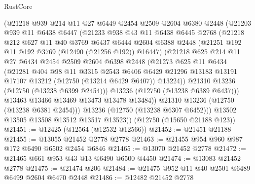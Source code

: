 \begin{lexlean}{RustCore}
\begin{coremodule}
          (@21218
            @939
            @214
            @11
            @27
            @6449
            @2454
            @2509
            @2604
            @6380
            @2448
            (@21203
              @939
              @11
              @6438
              @6447
              (@21233
                @938
                @43
                @11
                @6438
                @6445
                @2768
                (@21218
                  @212
                  @627
                  @11
                  @40
                  @3769
                  @6437
                  @6444
                  @2604
                  @6388
                  @2448
                  (@21251 @192 @11 @192 @3769 (@12490 (@21256 @192)) @16447)
                  (@21218
                    @625
                    @214
                    @11
                    @27
                    @6434
                    @2454
                    @2509
                    @2604
                    @6398
                    @2448
                    (@21273
                      @625
                      @11
                      @6434
                      (@21281
                        @404
                        @98
                        @11
                        @3315
                        @2543
                        @6406
                        @6429
                        @21296
                        @13183
                        @13191
                        @17107
                        @13212
                        (@12750 (@13214 @6429 @6407))
                        @13224))
                    @21310
                    @13236
                    (@12750 (@13238 @6399 @2454)))
                  @13236
                  (@12750 (@13238 @6389 @6437)))
                @13463
                @13466
                @13469
                @13473
                @13478
                @13484))
            @21310
            @13236
            (@12750 (@13238 @6381 @2454)))
          @13236
          (@12750 (@13238 @6307 @6452)))
        @13502
        @13505
        @13508
        @13512
        @13517
        @13523))
    (@12750 (@15650 @21188 @123))
@21451 := @12425 (@12564 (@12532 @12566))
@21452 := @21451 @21188
@21455 := @13055 @21452 @2778 @2778
@21463 := @21455 @954 @960 @987 @172 @6490 @6502 @2454 @6846
@21465 := @13070 @21452 @2778
@21472 := @21465 @661 @953 @43 @13 @6490 @6500 @4450
@21474 := @13083 @21452 @2778
@21475 := @21474 @206
@21484 := @21475 @952 @11 @40 @2501 @6489 @6499 @2604 @6470 @2448
@21486 := @12482 @21452 @2778

\end{coremodule}
\end{lexlean}
